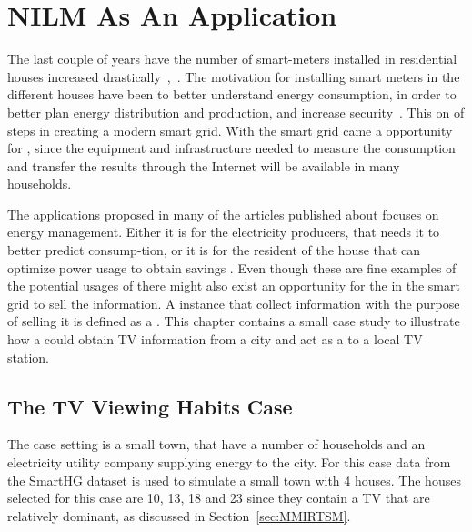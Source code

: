 \chapter{NILM As An Application} 
\label{sec:CaseStudy}
The last couple of years have the number of smart-meters installed in residential houses increased drastically~\citep{RefWorks:44},~\citep{RefWorks:45}. The motivation for installing smart meters in the different houses have been to better understand energy consumption, in order to better plan energy distribution and production, and increase security~\citep{RefWorks:43}. This on of steps in creating a modern smart grid. With the smart grid came a opportunity for , since the equipment and infrastructure needed to measure the consumption and transfer the results through the Internet will be available in many households. 

The applications proposed in many of the articles published about  focuses on energy management. Either it is for the electricity producers, that needs it to better predict consump-tion, or it is for the resident of the house that can optimize power usage to obtain savings \citep{RefWorks:17}. Even though these are fine examples of the potential usages of  there might also exist an opportunity for the  in the smart grid to sell the  information. A instance that collect information with the purpose of selling it is defined as a . This chapter contains a small case study to illustrate how a  could obtain TV information from a city and act as a  to a local TV station. 

\section{The TV Viewing Habits Case}
The case setting is a small town, that have a number of households and an electricity utility company supplying energy to the city. For this case data from the SmartHG dataset is used to simulate a small town with 4 houses. The houses selected for this case are 10, 13, 18 and 23  since they contain a TV that are relatively dominant, as discussed in Section~\ref{sec:MMIRTSM}. 

